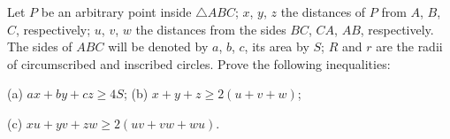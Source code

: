 Let $P$ be an arbitrary point inside $\triangle ABC$; $x$, $y$, $z$ the distances of $P$ from $A$, $B$, $C$, respectively; $u$, $v$, $w$ the distances from the sides $BC$, $CA$, $AB$, respectively. The sides of $ABC$ will be denoted by $a$, $b$, $c$, its area by $S$; $R$ and $r$ are the radii of circumscribed and inscribed circles. Prove the following inequalities:

(a) $ax + by + cz \geq 4S$; (b) $x + y + z \geq 2(u + v + w)$;

(c) $xu + yv + zw \geq 2(uv + vw + wu)$.

